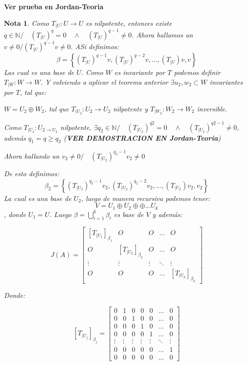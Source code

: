 \documentclass[10pt,a4paper]{article}
\newtheorem{mynote}{Nota}[section]
\begin{document}
\textbf{Ver prueba en Jordan-Teoria}

\begin{mynote}
Como $T_{|U}: U\rightarrow U$ es nilpotente, entonces existe $q\in\mathbb{N}/\quad \left(T_{|U}\right)^{q} = 0\quad\wedge\quad \left(T_{|U}\right)^{q-1} \neq 0$. Ahora hallamos un $v\neq 0/ \left(T_{|U}\right)^{q-1}v \neq 0$. ASi definimos:
$$\beta = \left\{ (T_{|U})^{q-1}v, (T_{|U})^{q-2}v, \ldots, (T_{|U})v, v\right\}$$
Las cual es una base de $U$. Como $W$ es invariante por $T$ podemos definir $T_{|W}:W\rightarrow W$. Y volviendo a aplicar el teorema anterior $\exists u_{2}, w_{2}\subset W$ invariantes por $T$, tal que:

$W = U_{2}\oplus W_{2}$, tal que $T_{|U_{2}}:U_{2}\rightarrow U_{2}$ nilpotente y $T_{|W_{2}}:W_{2}\rightarrow W_{2}$ inversible.

Como $T_{|U_{2}}:U_{2\rightarrow U_{2}}$ nilpotente, $\exists q_{2}\in\mathbb{N}/\quad (T_{|U_{2}})^{q2} = 0\quad\wedge\quad (T_{|U_{2}})^{q2-1} \neq 0$, además $q_{1} = q \geq q_{2}$ (\textbf{VER DEMOSTRACION EN Jordan-Teoria})

Ahora hallando un $v_{2}\neq 0/\quad (T_{|U_{2}})^{q_{2}-1}v_{2}\neq 0$

De esto definimos:
$$\beta_{2} = \left\{ (T_{|U_{2}})^{q_{2}-1}v_{2}, (T_{|U_{2}})^{q_{2}-2}v_{2}, \ldots, (T_{|U_{2}})v_{2}, v_{2}\right\}$$
La cual es una base de $U_{2}$, luego de manera recursiva podemos tener:
$$V = U_{1}\oplus U_{2}\oplus \oplus\ldots U_{k}$$
, donde $U_{1} = U$. Luego $\beta = \bigcup_{i=1}^{k}\beta_{i}$ es base de $V$ y además:

$$J(A) = \begin{bmatrix}
[T_{|U_{1}}]_{\beta_{1}}	&	O	&	O	&	\ldots	&	O\\
O	&	[T_{|U_{2}}]_{\beta_{2}}	&	O	&	\ldots	&	O\\
\vdots	&	\vdots	&	\vdots	&	\ddots	&	\vdots\\
O	&	O	&	O	&	\ldots	&	[T_{|U_{k}}]_{\beta_{k}}
\end{bmatrix}$$


Donde:

$$
[T_{|U_{j}}]_{\beta_{j}} = \begin{bmatrix}
0	&	1	&	0	&	0	&	0	&	\ldots	&	0\\
0	&	0	&	1	&	0	&	0	&	\ldots	&	0\\
0	&	0	&	0	&	1	&	0	&	\ldots	&	0\\
0	&	0	&	0	&	0	&	1	&	\ldots	&	0\\
\vdots	&	\vdots 	&	\vdots	&	\vdots	&	\vdots &	\ddots	&	\vdots\\
0	&	0	&	0	&	0	&	0	&	\ldots	&	1\\
0	&	0	&	0	&	0	&	0	&	\ldots	&	0
\end{bmatrix}$$
\end{mynote}
\end{document}
